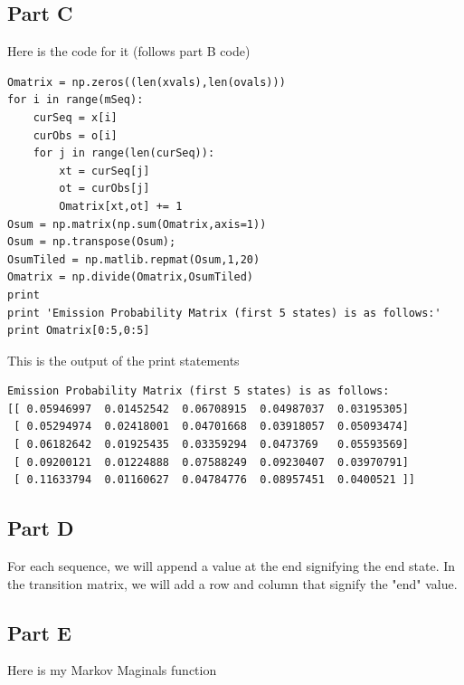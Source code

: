 \documentclass[twoside,11pt]{article}
\theoremstyle{definition}
\begin{document}
\subsection*{Part C}

Here is the code for it (follows part B code)

\begin{lstlisting}
Omatrix = np.zeros((len(xvals),len(ovals)))
for i in range(mSeq):
    curSeq = x[i]
    curObs = o[i]
    for j in range(len(curSeq)):
        xt = curSeq[j]
        ot = curObs[j]
        Omatrix[xt,ot] += 1
Osum = np.matrix(np.sum(Omatrix,axis=1))
Osum = np.transpose(Osum);
OsumTiled = np.matlib.repmat(Osum,1,20)
Omatrix = np.divide(Omatrix,OsumTiled)
print
print 'Emission Probability Matrix (first 5 states) is as follows:'
print Omatrix[0:5,0:5]
\end{lstlisting}

This is the output of the print statements
\begin{lstlisting}
Emission Probability Matrix (first 5 states) is as follows:
[[ 0.05946997  0.01452542  0.06708915  0.04987037  0.03195305]
 [ 0.05294974  0.02418001  0.04701668  0.03918057  0.05093474]
 [ 0.06182642  0.01925435  0.03359294  0.0473769   0.05593569]
 [ 0.09200121  0.01224888  0.07588249  0.09230407  0.03970791]
 [ 0.11633794  0.01160627  0.04784776  0.08957451  0.0400521 ]]
\end{lstlisting}

\subsection*{Part D}

For each sequence, we will append a value at the end signifying the end state. In the transition matrix, we will add a row and column that signify the "end" value. 

\subsection*{Part E}

Here is my Markov Maginals function
\end{document}
